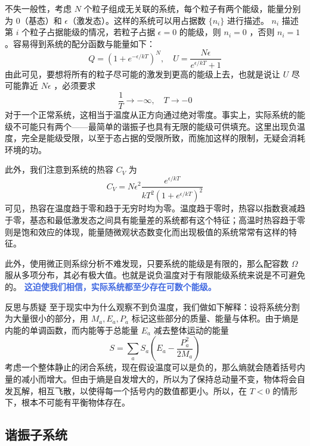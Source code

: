不失一般性，考虑 $N$ 个粒子组成无关联的系统，每个粒子有两个能级，能量分别为 $0$（基态）和 $\epsilon$（激发态）。这样的系统可以用占据数 $\{n_i\}$ 进行描述。 $n_i $ 描述第 $i$ 个粒子占据能级的情况，若粒子占据 $\epsilon  = 0$ 的能级，则 $n_i = 0$ ，否则 $n_i = 1$ 。容易得到系统的配分函数与能量如下：
\begin{equation}
    Q = (1+ e^{-\epsilon / kT})^N, \quad U = \frac{N\epsilon}{e^{\epsilon / kT} + 1}
\end{equation}
由此可见，要想将所有的粒子尽可能的激发到更高的能级上去，也就是说让 $U$ 尽可能靠近 $N\epsilon$ ，必须要求
\[
    \frac{1}{T} \rightarrow -\infty,\quad T \rightarrow -0
\]
对于一个正常系统，这相当于温度从正方向通过绝对零度。事实上，实际系统的能级不可能只有两个——最简单的谐振子也具有无限的能级可供填充。这里出现负温度，完全是能级受限，以至于态占据的受限所致，而施加这样的限制，无疑会消耗环境的功。

此外，我们注意到系统的热容 $C_V$ 为
\begin{equation}
    C_V = N\epsilon^2\frac{e^{\epsilon / kT}}{kT^2 (1+ e^{\epsilon / kT})^2} 
\end{equation}
可见，热容在温度趋于零和趋于无穷时均为零。温度趋于零时，热容以指数衰减趋于零，基态和最低激发态之间具有能量差的系统都有这个特征；高温时热容趋于零则是饱和效应的体现，能量随微观状态数变化而出现极值的系统常常有这样的特征。

此外，使用微正则系综分析不难发现，只要系统的能级是有限的，那么配容数 $\Omega$ 服从多项分布，其必有极大值。也就是说负温度对于有限能级系统来说是不可避免的。 \textcolor{RoyalBlue}{\textbf{\kaishu 这迫使我们相信，实际系统都至少存在可数个能级。}} 

\begin{justification}{\kaishu 反思与质疑}
\kaishu \fontsize{11pt}{16pt}
\quad\quad 至于现实中为什么观察不到负温度，我们做如下解释：设将系统分割为大量很小的部分，用 $M_a, E_a, P_a$ 标记这些部分的质量、能量与体积。由于熵是内能的单调函数，而内能等于总能量 $E_a$ 减去整体运动的能量
\begin{equation}
    S = \sum_a S_a\left(E_a - \frac{P_a^2}{2M_a} \right)
\end{equation}
考虑一个整体静止的闭合系统，现在假设温度可以是负的，那么熵就会随着括号内量的减小而增大。但由于熵是自发增大的，所以为了保持总动量不变，物体将会自发瓦解，相互飞散，以使得每一个括号内的数值都更小。所以，在 $T < 0$ 的情形下，根本不可能有平衡物体存在。
\end{justification}

\subsection{谐振子系统}

